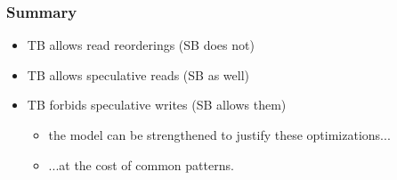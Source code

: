 \begin{frame}
    \frametitle{Summary}
    \begin{itemize}
        \item TB allows read reorderings (SB does not)
        \item TB allows speculative reads (SB as well)
        \item TB forbids speculative writes (SB allows them)
            \begin{itemize}
                \item the model can be strengthened to justify these optimizations...
                \item ...at the cost of common patterns.
            \end{itemize}
    \end{itemize}
\end{frame}
